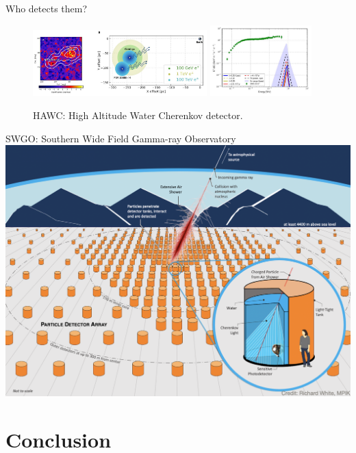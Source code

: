 \documentclass{beamer}
\begin{document}
\begin{frame}{Who detects them?}
\begin{figure}
\centering
\includegraphics[width=0.6\textwidth]{figures/hawc_7.png}
\includegraphics[width=0.35\textwidth]{figures/hawc_8.png}
\caption{\label{fig:y4} HAWC: High Altitude Water Cherenkov detector.}
\end{figure}
\end{frame}

\begin{frame}{SWGO: Southern Wide Field Gamma-ray Observatory}
\includegraphics[width=\textwidth]{figures/swgo_1.png}
\end{frame}

\section{Conclusion}
\end{document}
